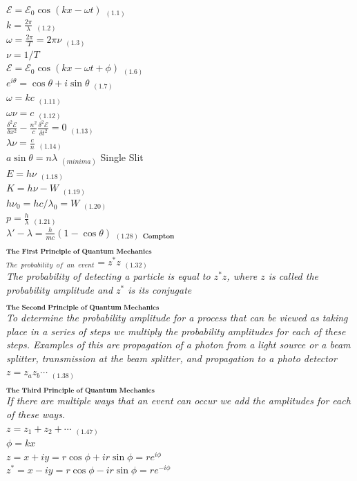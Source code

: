 \documentclass[0pt]{report}
\begin{document}
\begin{multicols}{3}
\begin{flushleft}
$\mathcal{E}=\mathcal{E}_0\cos(kx-\omega t)$ $_{(1.1)}$\\
$k=\frac{2\pi}{\lambda}$ $_{(1.2)}$\\
$\omega=\frac{2\pi}{T}=2\pi\nu$ $_{(1.3)}$\\
$\nu=1/T$\\
$\mathcal{E}=\mathcal{E}_0\cos(kx-\omega t+\phi)$ $_{(1.6)}$\\
$e^{i\theta}=\cos\theta+i\sin\theta$ $_{(1.7)}$\\
$\omega=kc$ $_{(1.11)}$\\
$\omega\nu=c$ $_{(1.12)}$\\
$\frac{\delta^2\mathcal{E}}{\delta x^2}-\frac{n^2}{c}\frac{\delta^2\mathcal{E}}{\delta t^2}=0$ $_{(1.13)}$\\
$\lambda\nu=\frac{c}{n}$ $_{(1.14)}$\\
$a\sin\theta=n\lambda$ $_{(minima)}$ Single Slit\\
$E=h\nu$ $_{(1.18)}$\\
$K=h\nu-W$ $_{(1.19)}$\\
$h\nu_0=hc/\lambda_0=W$ $_{(1.20)}$\\
$p=\frac{h}{\lambda}$ $_{(1.21)}$\\
$\lambda'-\lambda=\frac{h}{mc}(1-\cos\theta)$ $_{(1.28)}$ $_{\textbf{Compton}}$\\
$_{\textbf{The First Principle of Quantum Mechanics}}$\\
$_{The}$ $_{probability}$  $_{of}$  $_{an}$ $_{event}=z^*z$ $_{(1.32)}$\\
\textit{The probability of detecting a particle is equal to $z^*z$, where $z$ is called the probability amplitude and $z^*$ is its conjugate}\\
$_{\textbf{The Second Principle of Quantum Mechanics}}$\\
\textit{To determine the probability amplitude for a process that can be viewed as taking place in a series of steps we multiply the probability amplitudes for each of these steps. Examples of this are propagation of a photon from a light source or a beam splitter, transmission at the beam splitter, and propagation to a photo detector}\\
$z=z_az_b\cdots$ $_{(1.38)}$\\
$_{\textbf{The Third Principle of Quantum Mechanics}}$\\
\textit{If there are multiple ways that an event can occur we add the amplitudes for each of these ways.}\\
$z=z_1+z_2+\cdots$ $_{(1.47)}$\\
$\phi=kx$\\
$z=x+iy=r\cos\phi+ir\sin\phi=re^{i\phi}$\\
$z^*=x-iy=r\cos\phi-ir\sin\phi=re^{-i\phi}$\\


\end{flushleft}
\end{multicols}
\end{document}
